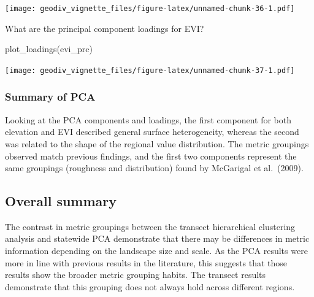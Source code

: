 \documentclass[
]{article}
\newenvironment{Shaded}{\begin{snugshade}}{\end{snugshade}}
\newcommand{\FunctionTok}[1]{\textcolor[rgb]{0.00,0.00,0.00}{#1}}
\newcommand{\NormalTok}[1]{#1}
\begin{document}
\texttt{[image: geodiv\_vignette\_files/figure-latex/unnamed-chunk-36-1.pdf]}

What are the principal component loadings for EVI?

\begin{Shaded}
\begin{Highlighting}[]
\FunctionTok{plot\_loadings}\NormalTok{(evi\_prc)}
\end{Highlighting}
\end{Shaded}

\texttt{[image: geodiv\_vignette\_files/figure-latex/unnamed-chunk-37-1.pdf]}

\hypertarget{summary-of-pca}{%
\subsubsection{Summary of PCA}\label{summary-of-pca}}

Looking at the PCA components and loadings, the first component for both
elevation and EVI described general surface heterogeneity, whereas the
second was related to the shape of the regional value distribution. The
metric groupings observed match previous findings, and the first two
components represent the same groupings (roughness and distribution)
found by McGarigal et al.~(2009).

\hypertarget{overall-summary}{%
\subsection{Overall summary}\label{overall-summary}}

The contrast in metric groupings between the transect hierarchical
clustering analysis and statewide PCA demonstrate that there may be
differences in metric information depending on the landscape size and
scale. As the PCA results were more in line with previous results in the
literature, this suggests that those results show the broader metric
grouping habits. The transect results demonstrate that this grouping
does not always hold across different regions.
\end{document}
